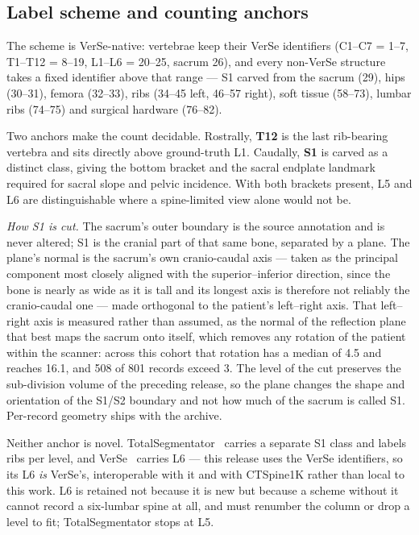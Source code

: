 \documentclass[aapm,mph,amsmath,amssymb,reprint,linenumbers]{revtex4-2}
\begin{document}
\subsection{Label scheme and counting anchors}

The scheme is VerSe-native: vertebrae keep their VerSe identifiers (C1--C7 = 1--7,
T1--T12 = 8--19, L1--L6 = 20--25, sacrum 26), and every non-VerSe structure takes a fixed
identifier above that range --- S1 carved from the sacrum (29), hips (30--31), femora
(32--33), ribs (34--45 left, 46--57 right), soft tissue (58--73), lumbar ribs (74--75)
and surgical hardware (76--82).

Two anchors make the count decidable. Rostrally, \textbf{T12} is the last rib-bearing
vertebra and sits directly above ground-truth L1. Caudally, \textbf{S1} is carved as a
distinct class, giving the bottom bracket and the sacral endplate landmark required for
sacral slope and pelvic incidence. With both brackets present, L5 and L6 are
distinguishable where a spine-limited view alone would not be.

\emph{How S1 is cut.} The sacrum's outer boundary is the source annotation and is never
altered; S1 is the cranial part of that same bone, separated by a plane. The plane's normal
is the sacrum's own cranio-caudal axis --- taken as the principal component most closely
aligned with the superior--inferior direction, since the bone is nearly as wide as it is
tall and its longest axis is therefore not reliably the cranio-caudal one --- made orthogonal
to the patient's left--right axis. That left--right axis is measured rather than assumed, as
the normal of the reflection plane that best maps the sacrum onto itself, which removes any
rotation of the patient within the scanner: across this cohort that rotation has a median of
4.5\textdegree{} and reaches 16.1\textdegree{}, and 508 of 801 records exceed
3\textdegree{}. The level of the cut preserves the sub-division volume of the preceding
release, so the plane changes the shape and orientation of the S1/S2 boundary and not how
much of the sacrum is called S1. Per-record geometry ships with the archive.

Neither anchor is novel. TotalSegmentator~\cite{totalsegmentator} carries a separate S1
class and labels ribs per level, and VerSe~\cite{verse2021} carries L6 --- this release uses
the VerSe identifiers, so its L6 \emph{is} VerSe's, interoperable with it and with CTSpine1K
rather than local to this work. L6 is retained not because it is new but because a scheme
without it cannot record a six-lumbar spine at all, and must renumber the column or drop a
level to fit; TotalSegmentator stops at L5.
\end{document}

